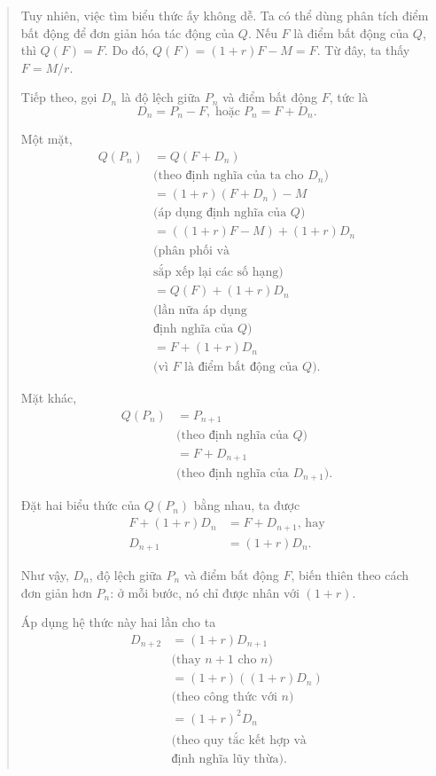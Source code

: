 {\begin{quote}
      Tuy nhiên, việc tìm biểu thức ấy không dễ. Ta có thể dùng phân tích điểm bất động để đơn giản hóa tác động của $Q$. Nếu $F$ là điểm bất động của $Q$, thì $Q(F)=F$. Do đó, $Q(F)=(1+r)F-M=F$. Từ đây, ta thấy $F=M/r$.

      Tiếp theo, gọi $D_n$ là độ lệch giữa $P_n$ và điểm bất động $F$, tức là
      $$
        D_n=P_n-F, \; \text{hoặc} \; P_n=F+D_n.
      $$

      Một mặt,
      \begin{align*}
      Q(P_n)
        &=Q(F+D_n) \\
          & \text{(theo định nghĩa của ta cho $D_n$)} \\
        &=(1+r)(F+D_n)-M \\
          & \text{(áp dụng định nghĩa của $Q$)} \\
        &=((1+r)F-M)+(1+r)D_n \\
          & \text{(phân phối và} \\
          & \text{sắp xếp lại các số hạng)} \\
        &=Q(F)+(1+r)D_n \\
          & \text{(lần nữa áp dụng} \\
          & \text{định nghĩa của $Q$)} \\
        &=F+(1+r)D_n \\
          & \text{(vì $F$ là điểm bất động của $Q$).}
      \end{align*}

      Mặt khác,
      \begin{align*}
      Q(P_n)
        &=P_{n+1} \\
          & \text{(theo định nghĩa của $Q$)} \\
        &=F+D_{n+1} \\
          & \text{(theo định nghĩa của $D_{n+1}$).}
      \end{align*}

      Đặt hai biểu thức của $Q(P_n)$ bằng nhau, ta được
      \begin{align*}
        F+(1+r)D_n&=F+D_{n+1}, \, \text{hay}\\
        D_{n+1}&=(1+r)D_n.
      \end{align*}

      Như vậy, $D_n$, độ lệch giữa $P_n$ và điểm bất động $F$, biến thiên theo cách đơn giản hơn $P_n$: ở mỗi bước, nó chỉ được nhân với $(1+r)$.\vspace{\baselineskip}

      Áp dụng hệ thức này hai lần cho ta\vspace{\baselineskip}
      \begin{align*}
        D_{n+2}
          &=(1+r)D_{n+1} \\
            & \text{(thay $n+1$ cho $n$)} \\
          &=(1+r)((1+r)D_n) \\
            & \text{(theo công thức với $n$)} \\
          &=(1+r)^2D_n \\
            & \text{(theo quy tắc kết hợp và} \\
            & \text{định nghĩa lũy thừa).}
      \end{align*}


\end{quote}}
